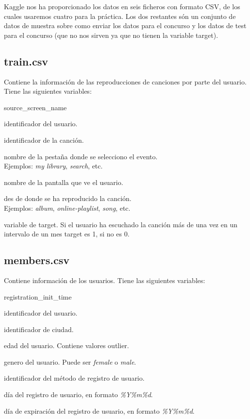 \documentclass[a4paper]{article}
\begin{document}
Kaggle nos ha proporcionado los datos en seis ficheros con formato CSV, de los cuales usaremos cuatro para la práctica. Los dos restantes són un conjunto de datos de muestra sobre como enviar los datos para el concurso y los datos de test para el concurso (que no nos sirven ya que no tienen la variable target).

\subsection*{train.csv}

Contiene la información de las reproducciones de canciones por parte del usuario. Tiene las siguientes variables:

\begin{labeling}{source\_screen\_name}
\item [msno] identificador del usuario.
\item [song\_id] identificador de la canción.
\item [source\_system\_tab] nombre de la pestaña donde se selecciono el evento.\\
Ejemplos: \textit{my library}, \textit{search}, etc.
\item [source\_screen\_name] nombre de la pantalla que ve el usuario.
\item [source\_type] des de donde se ha reproducido la canción.\\
Ejemplos: \textit{album}, \textit{online-playlist}, \textit{song}, etc.
\item [target] variable de target. Si el usuario ha escuchado la canción más de una vez en un intervalo de un mes target es 1, si no es 0.
\end{labeling}

\subsection*{members.csv}

Contiene información de los usuarios. Tiene las siguientes variables:

\begin{labeling}{registration\_init\_time}
\item [msno] identificador del usuario.
\item [city] identificador de ciudad.
\item [bd] edad del usuario. Contiene valores outlier.
\item [gender] genero del usuario. Puede ser \textit{female} o \textit{male}.
\item [registered\_via] identificador del método de registro de usuario.
\item [registration\_init\_time] día del registro de usuario, en formato \textit{\%Y\%m\%d}.
\item [expiration\_date] día de expiración del registro de usuario, en formato \textit{\%Y\%m\%d}.
\end{labeling}
\end{document}
